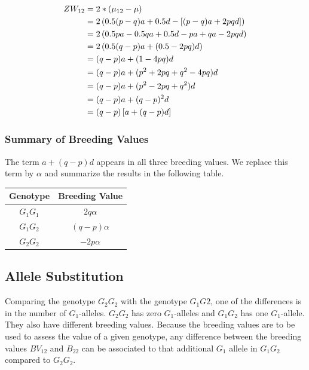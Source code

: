 \documentclass[]{book}
\theoremstyle{definition}
\theoremstyle{definition}
\theoremstyle{definition}
\theoremstyle{remark}
\begin{document}
\begin{align}
ZW_{12} &=   2*(\mu_{12} - \mu) \notag \\
        &=   2\left(0.5(p-q)a + 0.5d - \left[(p - q)a + 2pqd \right] \right) \notag \\
        &=   2\left(0.5pa - 0.5qa + 0.5d - pa + qa - 2pqd \right) \notag \\
        &=   2\left(0.5(q-p)a + (0.5 - 2pq)d \right) \notag \\
        &=   (q-p)a + (1-4pq)d  \notag \\
        &=   (q-p)a + (p^2 + 2pq + q^2 -4pq)d  \notag \\
        &=   (q-p)a + (p^2 - 2pq + q^2)d  \notag \\
        &=   (q-p)a + (q - p)^2d   \notag \\
        &=   (q-p)\left[a + (q-p)d \right]
\label{eq:BVGen12}
\end{align}

\hypertarget{summary-of-breeding-values}{%
\subsubsection{Summary of Breeding Values}\label{summary-of-breeding-values}}

The term \(a + (q-p)d\) appears in all three breeding values. We replace this term by \(\alpha\) and summarize the results in the following table.

\begin{tabular}{|c|c|}
  \hline
  Genotype  &  Breeding Value\\
  \hline
  $G_1G_1$  &  $2q\alpha$    \\
  \hline
  $G_1G_2$  &  $(q-p)\alpha$ \\
  \hline
  $G_2G_2$  &  $-2p\alpha$   \\
  \hline
  \end{tabular}

\hypertarget{allele-substitution}{%
\subsection{Allele Substitution}\label{allele-substitution}}

Comparing the genotype \(G_2G_2\) with the genotype \(G_1G2\), one of the differences is in the number of \(G_1\)-alleles. \(G_2G_2\) has zero \(G_1\)-alleles and \(G_1G_2\) has one \(G_1\)-allele. They also have different breeding values. Because the breeding values are to be used to assess the value of a given genotype, any difference between the breeding values \(BV_{12}\) and \(B_{22}\) can be associated to that additional \(G_1\) allele in \(G_1G_2\) compared to \(G_2G_2\).
\end{document}
